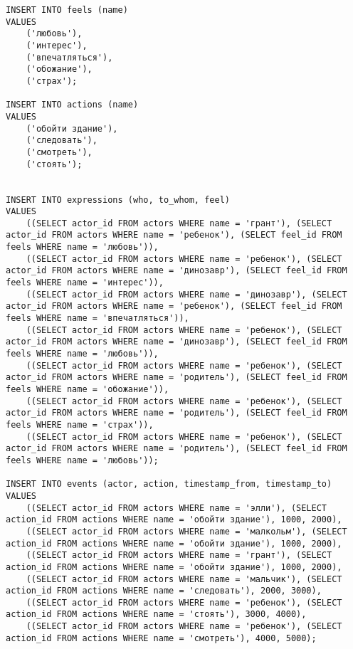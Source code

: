 \begin{verbatim}
INSERT INTO feels (name)
VALUES
    ('любовь'),
    ('интерес'),
    ('впечатляться'),
    ('обожание'),
    ('страх');

INSERT INTO actions (name)
VALUES
    ('обойти здание'),
    ('следовать'),
    ('смотреть'),
    ('стоять');


INSERT INTO expressions (who, to_whom, feel)
VALUES
    ((SELECT actor_id FROM actors WHERE name = 'грант'), (SELECT actor_id FROM actors WHERE name = 'ребенок'), (SELECT feel_id FROM feels WHERE name = 'любовь')),
    ((SELECT actor_id FROM actors WHERE name = 'ребенок'), (SELECT actor_id FROM actors WHERE name = 'динозавр'), (SELECT feel_id FROM feels WHERE name = 'интерес')),
    ((SELECT actor_id FROM actors WHERE name = 'динозавр'), (SELECT actor_id FROM actors WHERE name = 'ребенок'), (SELECT feel_id FROM feels WHERE name = 'впечатляться')),
    ((SELECT actor_id FROM actors WHERE name = 'ребенок'), (SELECT actor_id FROM actors WHERE name = 'динозавр'), (SELECT feel_id FROM feels WHERE name = 'любовь')),
    ((SELECT actor_id FROM actors WHERE name = 'ребенок'), (SELECT actor_id FROM actors WHERE name = 'родитель'), (SELECT feel_id FROM feels WHERE name = 'обожание')),
    ((SELECT actor_id FROM actors WHERE name = 'ребенок'), (SELECT actor_id FROM actors WHERE name = 'родитель'), (SELECT feel_id FROM feels WHERE name = 'страх')),
    ((SELECT actor_id FROM actors WHERE name = 'ребенок'), (SELECT actor_id FROM actors WHERE name = 'родитель'), (SELECT feel_id FROM feels WHERE name = 'любовь'));

INSERT INTO events (actor, action, timestamp_from, timestamp_to)
VALUES
    ((SELECT actor_id FROM actors WHERE name = 'элли'), (SELECT action_id FROM actions WHERE name = 'обойти здание'), 1000, 2000),
    ((SELECT actor_id FROM actors WHERE name = 'малкольм'), (SELECT action_id FROM actions WHERE name = 'обойти здание'), 1000, 2000),
    ((SELECT actor_id FROM actors WHERE name = 'грант'), (SELECT action_id FROM actions WHERE name = 'обойти здание'), 1000, 2000),
    ((SELECT actor_id FROM actors WHERE name = 'мальчик'), (SELECT action_id FROM actions WHERE name = 'следовать'), 2000, 3000),
    ((SELECT actor_id FROM actors WHERE name = 'ребенок'), (SELECT action_id FROM actions WHERE name = 'стоять'), 3000, 4000),
    ((SELECT actor_id FROM actors WHERE name = 'ребенок'), (SELECT action_id FROM actions WHERE name = 'смотреть'), 4000, 5000);
\end{verbatim}